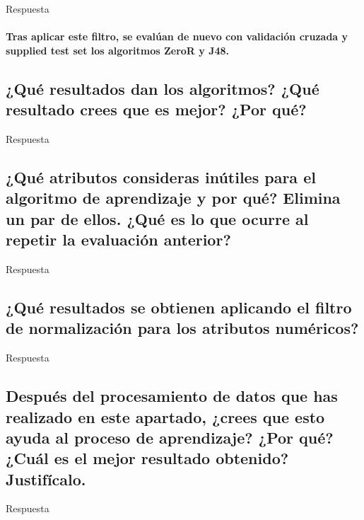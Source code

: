 \documentclass[12pt]{article}
\begin{document}
Respuesta

\paragraph{\small Tras aplicar este filtro, se evalúan de nuevo con validación
cruzada y supplied test set los algoritmos ZeroR y J48.}

\subsection*{\small ¿Qué resultados dan los algoritmos? ¿Qué resultado crees que
es mejor? ¿Por qué?}

Respuesta

\subsection*{\small ¿Qué atributos consideras inútiles para el algoritmo de
aprendizaje y por qué? Elimina un par de ellos. ¿Qué es lo que ocurre al
repetir la evaluación anterior?}

Respuesta

\subsection*{\small ¿Qué resultados se obtienen aplicando el filtro de
normalización para los atributos numéricos?}

Respuesta

\subsection*{\small Después del procesamiento de datos que has realizado en este
apartado, ¿crees que esto ayuda al proceso de aprendizaje? ¿Por qué? ¿Cuál es
el mejor resultado obtenido? Justifícalo.}

Respuesta
\end{document}

